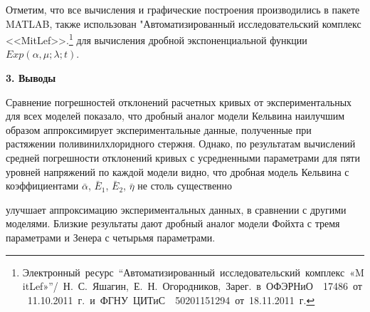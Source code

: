 \documentclass[11pt,a4paper,twoside]{article}
\begin{document}
Отметим, что все вычисления и графические построения производились в пакете MATLAB, также использован "Автоматизированный исследовательский комплекс \mbox{<<MitLef>>.\footnote{Электронный ресурс ``Автоматизированный исследовательский комплекс «MitLef»''/ Н.~С.~Яшагин, Е.~Н.~Огородников, Зарег. в ОФЭРНиО \No~17486 от 11.10.2011~г. и ФГНУ ЦИТиС \No~50201151294 от 18.11.2011~г.}} для вычисления дробной экспоненциальной функции $Exp(\alpha,\mu;\lambda;t)$.











\smallskip





{\bf3. Выводы} 








Сравнение погрешностей отклонений расчетных кривых от экспериментальных для всех моделей показало, что дробный аналог модели Кельвина наилучшим образом аппроксимирует экспериментальные данные, полученные при растяжении поливинилхлоридного стержня. Однако, по результатам вычислений средней погрешности отклонений кривых с усредненными параметрами для пяти уровней напряжений по каждой модели видно, что дробная модель Кельвина с коэффициентами $\bar{\alpha}$, $\bar{E}_{1}$, $\bar{E}_{2}$, $\bar{\eta}$ не столь существенно 


улучшает аппроксимацию экспериментальных данных, в сравнении с другими моделями. Близкие результаты дают дробный аналог модели Фойхта с тремя параметрами и Зенера с четырьмя параметрами.





 


























		


		


\end{document}
